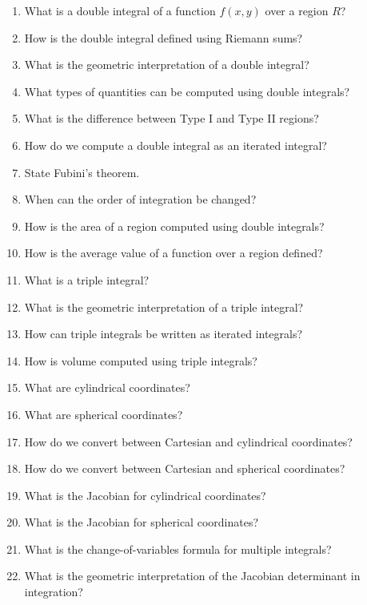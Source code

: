 \begin{enumerate}[resume]
  \item What is a double integral of a function \(f(x,y)\) over a region \(R\)?
  \item How is the double integral defined using Riemann sums?
  \item What is the geometric interpretation of a double integral?
  \item What types of quantities can be computed using double integrals?
  \item What is the difference between Type I and Type II regions?
  \item How do we compute a double integral as an iterated integral?
  \item State Fubini's theorem.
  \item When can the order of integration be changed?
  \item How is the area of a region computed using double integrals?
  \item How is the average value of a function over a region defined?
  \item What is a triple integral?
  \item What is the geometric interpretation of a triple integral?
  \item How can triple integrals be written as iterated integrals?
  \item How is volume computed using triple integrals?
  \item What are cylindrical coordinates?
  \item What are spherical coordinates?
  \item How do we convert between Cartesian and cylindrical coordinates?
  \item How do we convert between Cartesian and spherical coordinates?
  \item What is the Jacobian for cylindrical coordinates?
  \item What is the Jacobian for spherical coordinates?
  \item What is the change-of-variables formula for multiple integrals?
  \item What is the geometric interpretation of the Jacobian determinant in integration?
\end{enumerate}

